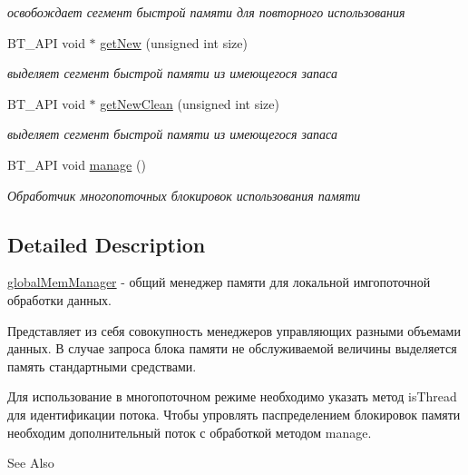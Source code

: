 \begin{DoxyCompactItemize}
\begin{DoxyCompactList}\small\item\em освобождает сегмент быстрой памяти для повторного использования \end{DoxyCompactList}\item 
\hypertarget{classbt_1_1global_mem_manager_a4235e4676192c6a7cecac4445531e8d5}{B\-T\-\_\-\-A\-P\-I void $\ast$ \hyperlink{classbt_1_1global_mem_manager_a4235e4676192c6a7cecac4445531e8d5}{get\-New} (unsigned int size)}\label{classbt_1_1global_mem_manager_a4235e4676192c6a7cecac4445531e8d5}

\begin{DoxyCompactList}\small\item\em выделяет сегмент быстрой памяти из имеющегося запаса \end{DoxyCompactList}\item 
\hypertarget{classbt_1_1global_mem_manager_a8bd0d2d9786bdeea2b2f9ff5789b97ea}{B\-T\-\_\-\-A\-P\-I void $\ast$ \hyperlink{classbt_1_1global_mem_manager_a8bd0d2d9786bdeea2b2f9ff5789b97ea}{get\-New\-Clean} (unsigned int size)}\label{classbt_1_1global_mem_manager_a8bd0d2d9786bdeea2b2f9ff5789b97ea}

\begin{DoxyCompactList}\small\item\em выделяет сегмент быстрой памяти из имеющегося запаса \end{DoxyCompactList}\item 
\hypertarget{classbt_1_1global_mem_manager_a50f8bcb40f4d7b9bb686506ec25a4716}{B\-T\-\_\-\-A\-P\-I void \hyperlink{classbt_1_1global_mem_manager_a50f8bcb40f4d7b9bb686506ec25a4716}{manage} ()}\label{classbt_1_1global_mem_manager_a50f8bcb40f4d7b9bb686506ec25a4716}

\begin{DoxyCompactList}\small\item\em Обработчик многопоточных блокировок использования памяти \end{DoxyCompactList}\end{DoxyCompactItemize}


\subsection{Detailed Description}
\hyperlink{classbt_1_1global_mem_manager}{global\-Mem\-Manager} -\/ общий менеджер памяти для локальной имгопоточной обработки данных. 

Представляет из себя совокупность менеджеров управляющих разными объемами данных. В случае запроса блока памяти не обслуживаемой величины выделяется память стандартными средствами.

Для использование в многопоточном режиме необходимо указать метод is\-Thread для идентификации потока. Чтобы упровлять паспределением блокировок памяти необходим дополнительный поток с обработкой методом manage.

\begin{DoxySeeAlso}{See Also}

\end{DoxySeeAlso}
